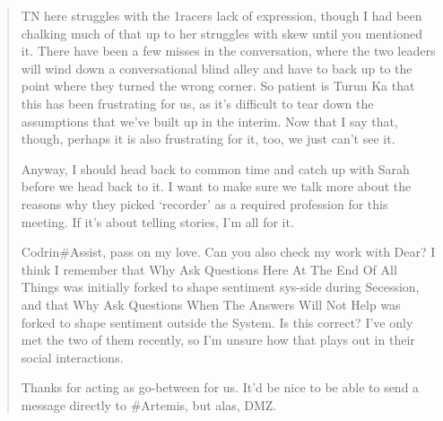 \begin{quote}
TN here struggles with the 1racers lack of expression, though I had been chalking much of that up to her struggles with skew until you mentioned it. There have been a few misses in the conversation, where the two leaders will wind down a conversational blind alley and have to back up to the point where they turned the wrong corner. So patient is Turun Ka that this has been frustrating for us, as it's difficult to tear down the assumptions that we've built up in the interim. Now that I say that, though, perhaps it is also frustrating for it, too, we just can't see it.

Anyway, I should head back to common time and catch up with Sarah before we head back to it. I want to make sure we talk more about the reasons why they picked `recorder' as a required profession for this meeting. If it's about telling stories, I'm all for it.

Codrin\#Assist, pass on my love. Can you also check my work with Dear? I think I remember that Why Ask Questions Here At The End Of All Things was initially forked to shape sentiment sys-side during Secession, and that Why Ask Questions When The Answers Will Not Help was forked to shape sentiment outside the System. Is this correct? I've only met the two of them recently, so I'm unsure how that plays out in their social interactions.

Thanks for acting as go-between for us. It'd be nice to be able to send a message directly to \#Artemis, but alas, DMZ.
\end{quote}
